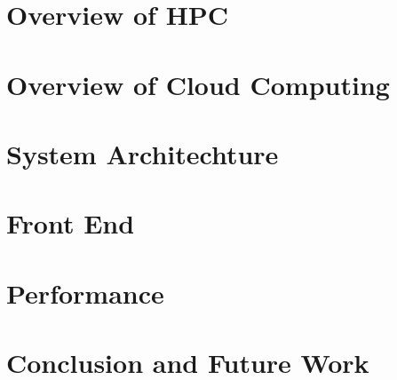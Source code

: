 \documentclass[a4paper]{article}
\begin{document}


\section{Overview of HPC}
\blindtext
\blindtext
\blindtext
\blindtext

\section{Overview of Cloud Computing}
\blindtext
\blindtext
\blindtext
\blindtext

\section{System Architechture}
\blindtext
\blindtext
\blindtext
\blindtext

\section{Front End}
\blindtext
\blindtext
\blindtext
\blindtext

\section{Performance}
\blindtext
\blindtext
\blindtext
\blindtext

\section{Conclusion and Future Work}
\blindtext
\blindtext
\end{document}
